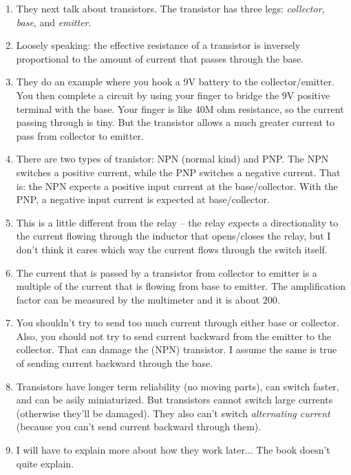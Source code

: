 \documentclass[11pt, oneside]{amsart}
\begin{document}
\begin{enumerate}
  \item They next talk about transistors. The transistor has three legs:
  \emph{collector}, \emph{base}, and \emph{emitter}.

  \item Loosely speaking: the effective resistance of a transistor is
  inversely proportional to the amount of current that passes through
  the base.

  \item They do an example where you hook a 9V battery to the
  collector/emitter. You then complete a circuit by using your finger to
  bridge the 9V positive terminal with the base. Your finger is like 40M
  ohm resistance, so the current passing through is tiny. But the
  transistor allows a much greater current to pass from collector to
  emitter.

  \item There are two types of tranistor: NPN (normal kind) and PNP. The
  NPN switches a positive current, while the PNP switches a negative
  current. That is: the NPN expects a positive input current at the
  base/collector. With the PNP, a negative input current is expected at
  base/collector.

  \item This is a little different from the relay -- the relay expects a
  directionality to the current flowing through the inductor that
  opens/closes the relay, but I don't think it cares which way the
  current flows through the switch itself.

  \item The current that is passed by a transistor from collector to
  emitter is a multiple of the current that is flowing from base to
  emitter. The amplification factor can be measured by the multimeter
  and it is about 200.

  \item You shouldn't try to send too much current through either base
  or collector. Also, you should not try to send current backward from
  the emitter to the collector. That can damage the (NPN) transistor. I
  assume the same is true of sending current backward through the base.

  \item Transistors have longer term reliability (no moving parts), can
  switch faster, and can be asily miniaturized. But transistors cannot
  switch large currents (otherwise they'll be damaged). They also can't
  switch \emph{alternating current} (because you can't send current
  backward through them).

  \item I will have to explain more about how they work later... The
  book doesn't quite explain.
\end{enumerate}
\end{document}
